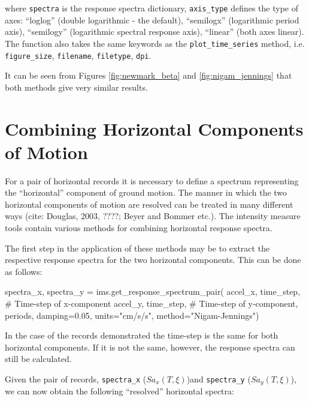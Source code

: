 \noindent where \verb=spectra= is the response spectra dictionary, \verb=axis_type= defines the type of axes: ``loglog'' (double logarithmic - the default), ``semilogx'' (logarithmic period axis), ``semilogy'' (logarithmic spectral response axis), ``linear'' (both axes linear). The function also takes the same keywords as the \verb=plot_time_series= method, i.e. \verb=figure_size=, \verb=filename=, \verb=filetype=, \verb=dpi=.

It can be seen from Figures  \ref{fig:newmark_beta} and \ref{fig:nigam_jennings} that both methods give very similar results.

\section{Combining Horizontal Components of Motion}
\label{sec:horizontal}

For a pair of horizontal records it is necessary to define a spectrum representing the ``horizontal'' component of ground motion. The manner in which the two horizontal components of motion are resolved can be treated in many different ways (cite: Douglas, 2003, ????; Beyer and Bommer etc.). The intensity measure tools contain various methods for combining horizontal response spectra. 

The first step in the application of these methods may be to extract the respective response spectra for the two horizontal components. This can be done as follows:

\begin{python}[frame=single]
spectra_x, spectra_y = ims.get_response_spectrum_pair(
    accel_x,
    time_step, # Time-step of x-component
    accel_y,
    time_step, # Time-step of y-component,
    periods,
    damping=0.05,
    units="cm/s/s",
    method="Nigam-Jennings")
\end{python}

In the case of the records demonstrated the time-step is the same for both horizontal components. If it is not the same, however, the response spectra can still be calculated.

Given the pair of records, \verb=spectra_x= ($Sa_x \left( {T, \xi} \right)$)and \verb=spectra_y= ($Sa_y \left( {T, \xi} \right)$), we can now obtain the following ``resolved'' horizontal spectra:

